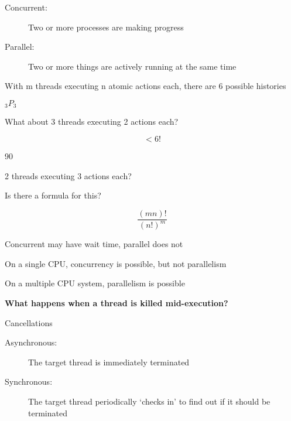 \documentclass{article}
\begin{document}
\begin{description}
    \item[Concurrent: ] Two or more processes are making progress
    \item[Parallel: ] Two or more things are actively running at the same time
\end{description}

With m threads executing n atomic actions each, there are 6 possible histories

\(_3 P _3\)

What about 3 threads executing 2 actions each?

\begin{equation*}
    < 6!
\end{equation*}

90

2 threads executing 3 actions each?

Is there a formula for this?

\begin{equation*}
    \frac{(mn)!}{(n!)^m}
\end{equation*}

Concurrent may have wait time, parallel does not

On a single CPU, concurrency is possible, but not parallelism

On a multiple CPU system, parallelism is possible

\textbf{What happens when a thread is killed mid-execution?}

Cancellations

\begin{description}
    \item[Asynchronous: ] The target thread is immediately terminated
    \item[Synchronous: ] The target thread periodically `checks in' to find out if it should be terminated
\end{description}
\end{document}
